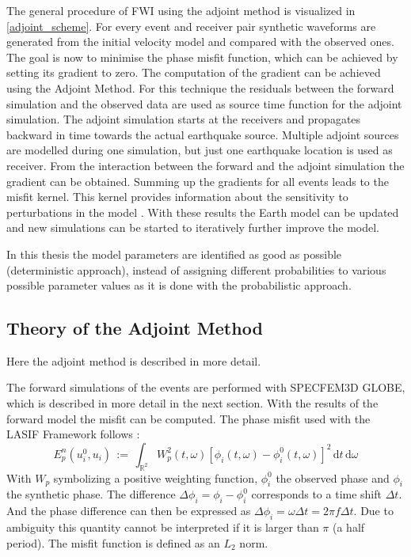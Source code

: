 The general procedure of FWI using the adjoint method is visualized in \autoref{adjoint_scheme}.
For every event and receiver pair synthetic waveforms are generated from the initial velocity model and 
compared with the observed ones.
%
The goal is now to minimise the phase misfit function, which can be achieved by setting its gradient to zero.
The computation of the gradient can be achieved using the Adjoint Method. 
For this technique the residuals between the forward simulation and the observed data are used as source time function 
for the adjoint simulation. 
The adjoint simulation starts at the receivers and propagates backward in time towards the actual earthquake source.
Multiple adjoint sources are modelled during one simulation, but just one earthquake location is used as receiver.
From the interaction between the forward and the adjoint simulation the gradient can be obtained. 
Summing up the gradients for all events leads to the misfit kernel. 
This kernel provides information about the sensitivity to perturbations in the model \citep{Magnoni2012}.
With these results the Earth model can be updated and new simulations can be started to iteratively further improve the model.

In this thesis the model parameters are identified as good as possible (deterministic approach), instead of assigning
different probabilities to various possible parameter values as it is done with the probabilistic approach.

\subsection{Theory of the Adjoint Method}
\label{Theory_Adjoint}

Here the adjoint method is described in more detail.

The forward simulations of the events are performed with SPECFEM3D GLOBE, which is described in more detail in the next section.
%
With the results of the forward model the misfit can be computed.
The phase misfit used with the LASIF Framework follows \citealp{Fichtner2009}:
%
\begin{equation} 
E_p^n(u_i^0, u_i) \, := \, \int_{\mathbb{R}^2} W_p^2(t,\omega) [\phi_i(t,\omega) - \phi_i^0(t,\omega)]^2 
   \, \mathrm{d}t \, \mathrm{d}\omega
\end{equation}
%
With $W_p$ symbolizing a positive weighting function, $\phi_i^0$ the observed phase and $\phi_i$ the synthetic phase.
The difference $\Delta \phi_i = \phi_i - \phi_i^0$ corresponds to a time shift $\Delta t$. 
And the phase difference can then be expressed as $\Delta \phi_i = \omega \Delta t = 2 \pi f \Delta t$.
Due to ambiguity this quantity cannot be interpreted if it is larger than $\pi$ (a half period).
The misfit function is defined as an $L_2$ norm. %


